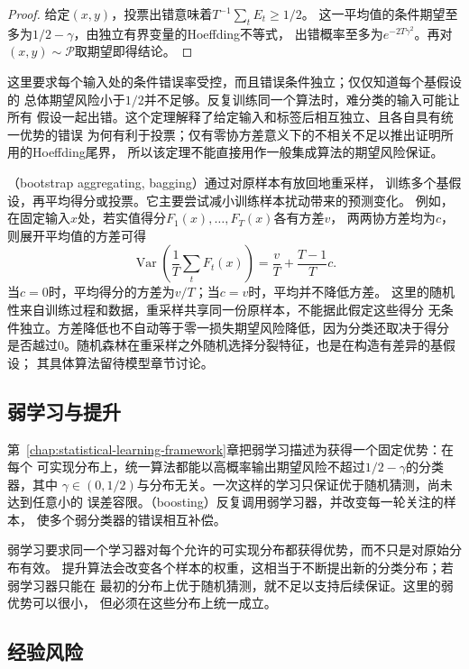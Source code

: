 \begin{proof}
给定$(x,y)$，投票出错意味着$T^{-1}\sum_tE_t\geq1/2$。
这一平均值的条件期望至多为$1/2-\gamma$，由独立有界变量的Hoeffding不等式，
出错概率至多为$e^{-2T\gamma^2}$。再对$(x,y)\sim\mathcal P$取期望即得结论。
\end{proof}

这里要求每个输入处的条件错误率受控，而且错误条件独立；仅仅知道每个基假设的
总体期望风险小于$1/2$并不足够。反复训练同一个算法时，难分类的输入可能让所有
假设一起出错。这个定理解释了给定输入和标签后相互独立、且各自具有统一优势的错误
为何有利于投票；仅有零协方差意义下的不相关不足以推出证明所用的Hoeffding尾界，
所以该定理不能直接用作一般集成算法的期望风险保证。

（bootstrap aggregating, bagging）通过对原样本有放回地重采样，
训练多个基假设，再平均得分或投票。它主要尝试减小训练样本扰动带来的预测变化。
例如，在固定输入$x$处，若实值得分$F_1(x),\ldots,F_T(x)$各有方差$v$，
两两协方差均为$c$，则展开平均值的方差可得
\[
 \operatorname{Var}\!\left(\frac1T\sum_tF_t(x)\right)
 =\frac{v}{T}+\frac{T-1}{T}c.
\]
当$c=0$时，平均得分的方差为$v/T$；当$c=v$时，平均并不降低方差。
这里的随机性来自训练过程和数据，重采样共享同一份原样本，不能据此假定这些得分
无条件独立。方差降低也不自动等于零一损失期望风险降低，因为分类还取决于得分
是否越过0。随机森林在重采样之外随机选择分裂特征，也是在构造有差异的基假设；
其具体算法留待模型章节讨论。

\subsection{弱学习与提升}

第~\ref{chap:statistical-learning-framework}章把弱学习描述为获得一个固定优势：在每个
可实现分布上，统一算法都能以高概率输出期望风险不超过$1/2-\gamma$的分类器，其中
$\gamma\in(0,1/2)$与分布无关。一次这样的学习只保证优于随机猜测，尚未达到任意小的
误差容限。（boosting）反复调用弱学习器，并改变每一轮关注的样本，
使多个弱分类器的错误相互补偿。

弱学习要求同一个学习器对每个允许的可实现分布都获得优势，而不只是对原始分布有效。
提升算法会改变各个样本的权重，这相当于不断提出新的分类分布；若弱学习器只能在
最初的分布上优于随机猜测，就不足以支持后续保证。这里的弱优势可以很小，
但必须在这些分布上统一成立。

\subsection{经验风险}

